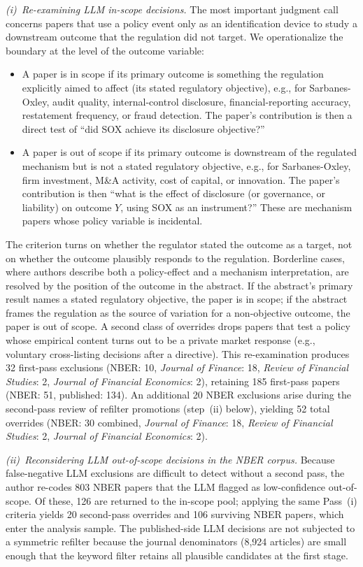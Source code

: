 \documentclass[12pt]{article}
\newcommand{\JF}{\textit{Journal of Finance}}
\newcommand{\RFS}{\textit{Review of Financial Studies}}
\newcommand{\JFE}{\textit{Journal of Financial Economics}}
\begin{document}
\textit{(i)~Re-examining LLM in-scope decisions.}  The most important
judgment call concerns papers that use a policy event only as an
identification device to study a downstream outcome that the regulation
did not target.  We operationalize the boundary at the level of the
outcome variable:
\begin{itemize}
\item A paper is in scope if its primary outcome is something
the regulation explicitly aimed to affect (its stated regulatory
objective), e.g., for Sarbanes-Oxley, audit quality, internal-control
disclosure, financial-reporting accuracy, restatement frequency, or
fraud detection.  The paper's contribution is then a direct test of
``did SOX achieve its disclosure objective?''
\item A paper is out of scope if its primary outcome is
downstream of the regulated mechanism but is not a stated
regulatory objective, e.g., for Sarbanes-Oxley, firm investment,
M\&A activity, cost of capital, or innovation.  The paper's contribution
is then ``what is the effect of disclosure (or governance, or
liability) on outcome $Y$, using SOX as an instrument?''  These are
mechanism papers whose policy variable is incidental.
\end{itemize}
The criterion turns on whether the regulator stated the outcome as a
target, not on whether the outcome plausibly responds to the
regulation.  Borderline cases, where authors describe both a
policy-effect and a mechanism interpretation, are resolved by the
position of the outcome in the abstract.  If the abstract's primary
result names a stated regulatory objective, the paper is in scope; if
the abstract frames the regulation as the source of variation for a
non-objective outcome, the paper is out of scope.  A second class of
overrides drops papers that test a policy whose empirical content turns
out to be a private market response (e.g., voluntary cross-listing
decisions after a directive).  This re-examination produces 32 first-pass
exclusions (NBER: 10, \JF{}: 18, \RFS{}: 2, \JFE{}: 2), retaining 185
first-pass papers (NBER: 51, published: 134).  An additional 20 NBER
exclusions arise during the second-pass review of refilter promotions
(step~(ii) below), yielding 52 total overrides (NBER: 30 combined,
\JF{}: 18, \RFS{}: 2, \JFE{}: 2).

\textit{(ii)~Reconsidering LLM out-of-scope decisions in the NBER corpus.}
Because false-negative LLM exclusions are difficult to detect without a
second pass, the author re-codes 803 NBER papers that the LLM flagged as
low-confidence out-of-scope.  Of these, 126 are returned to the in-scope
pool; applying the same Pass~(i) criteria yields 20 second-pass overrides
and 106 surviving NBER papers, which enter the analysis sample.  The published-side LLM decisions are not subjected to a symmetric
refilter because the journal denominators (8,924 articles) are small
enough that the keyword filter retains all plausible candidates at the
first stage.
\end{document}
